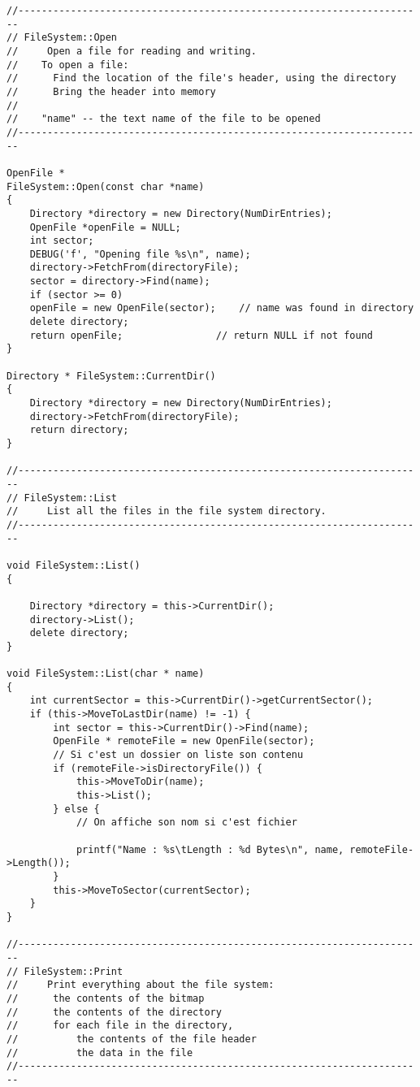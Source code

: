 \documentclass[a4paper,10pt]{article}
\begin{document}
\begin{lstlisting}
//----------------------------------------------------------------------
// FileSystem::Open
//     Open a file for reading and writing.
//    To open a file:
//      Find the location of the file's header, using the directory
//      Bring the header into memory
//
//    "name" -- the text name of the file to be opened
//----------------------------------------------------------------------

OpenFile *
FileSystem::Open(const char *name)
{
    Directory *directory = new Directory(NumDirEntries);
    OpenFile *openFile = NULL;
    int sector;
    DEBUG('f', "Opening file %s\n", name);
    directory->FetchFrom(directoryFile);
    sector = directory->Find(name);
    if (sector >= 0)
    openFile = new OpenFile(sector);    // name was found in directory
    delete directory;
    return openFile;                // return NULL if not found
}

Directory * FileSystem::CurrentDir()
{
    Directory *directory = new Directory(NumDirEntries);
    directory->FetchFrom(directoryFile);
    return directory;
}

//----------------------------------------------------------------------
// FileSystem::List
//     List all the files in the file system directory.
//----------------------------------------------------------------------

void FileSystem::List()
{

    Directory *directory = this->CurrentDir();
    directory->List();
    delete directory;
}

void FileSystem::List(char * name)
{
    int currentSector = this->CurrentDir()->getCurrentSector();
    if (this->MoveToLastDir(name) != -1) {
        int sector = this->CurrentDir()->Find(name);
        OpenFile * remoteFile = new OpenFile(sector);
        // Si c'est un dossier on liste son contenu
        if (remoteFile->isDirectoryFile()) {
            this->MoveToDir(name);
            this->List();
        } else {
            // On affiche son nom si c'est fichier

            printf("Name : %s\tLength : %d Bytes\n", name, remoteFile->Length());
        }
        this->MoveToSector(currentSector);
    }
}

//----------------------------------------------------------------------
// FileSystem::Print
//     Print everything about the file system:
//      the contents of the bitmap
//      the contents of the directory
//      for each file in the directory,
//          the contents of the file header
//          the data in the file
//----------------------------------------------------------------------


\end{lstlisting}
\end{document}
